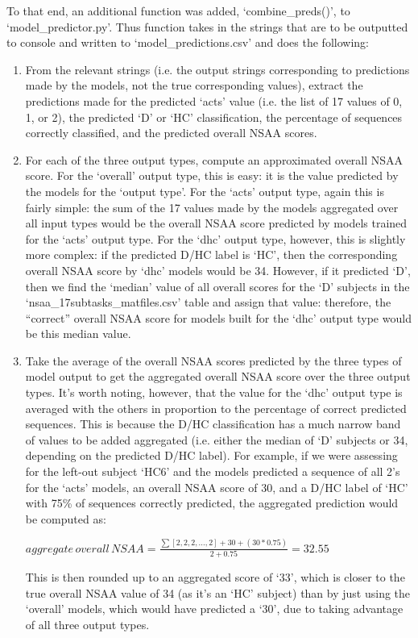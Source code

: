 \documentclass[12pt,twoside]{report}
\begin{document}
\quad To that end, an additional function was added, ‘combine\_preds()’, to ‘model\_predictor.py’. Thus function takes in the strings that are to be outputted to console and written to ‘model\_predictions.csv’ and does the following:

\begin{enumerate}
	\item From the relevant strings (i.e. the output strings corresponding to predictions made by the models, not the true corresponding values), extract the predictions made for the predicted ‘acts’ value (i.e. the list of 17 values of 0, 1, or 2), the predicted ‘D’ or ‘HC’ classification, the percentage of sequences correctly classified, and the predicted overall NSAA scores.
	\item For each of the three output types, compute an approximated overall NSAA score. For the ‘overall’ output type, this is easy: it is the value predicted by the models for the ‘output type’. For the ‘acts’ output type, again this is fairly simple: the sum of the 17 values made by the models aggregated over all input types would be the overall NSAA score predicted by models trained for the ‘acts’ output type. For the ‘dhc’ output type, however, this is slightly more complex: if the predicted D/HC label is ‘HC’, then the corresponding overall NSAA score by ‘dhc’ models would be 34. However, if it predicted ‘D’, then we find the ‘median’ value of all overall scores for the ‘D’ subjects in the ‘nsaa\_17subtasks\_matfiles.csv’ table and assign that value: therefore, the “correct” overall NSAA score for models built for the ‘dhc’ output type would be this median value.
	\item Take the average of the overall NSAA scores predicted by the three types of model output to get the aggregated overall NSAA score over the three output types. It’s worth noting, however, that the value for the ‘dhc’ output type is averaged with the others in proportion to the percentage of correct predicted sequences. This is because the D/HC classification has a much narrow band of values to be added aggregated (i.e. either the median of ‘D’ subjects or 34, depending on the predicted D/HC label). For example, if we were assessing for the left-out subject ‘HC6’ and the models predicted a sequence of all 2’s for the ‘acts’ models, an overall NSAA score of 30, and a D/HC label of ‘HC’ with 75\% of sequences correctly predicted, the aggregated prediction would be computed as:
	\begin{center}
	$aggregate\, overall\, NSAA=\frac{\sum{}{}{[2, 2, 2, ..., 2]} + 30 + (30*0.75)}{2 + 0.75} = 32.55$
	\end{center}
	This is then rounded up to an aggregated score of ‘33’, which is closer to the true overall NSAA value of 34 (as it’s an ‘HC’ subject) than by just using the ‘overall’ models, which would have predicted a ‘30’, due to taking advantage of all three output types.
\end{enumerate}
\end{document}

